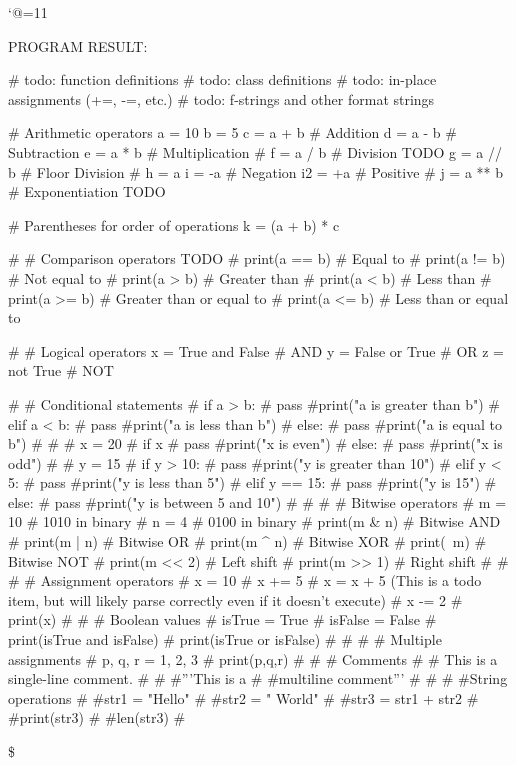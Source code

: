 \let\e\expandafter
\catcode`@=11

\def\@pytexError#1{%
	\errmessage{#1}%
}









\def\@pytexChar@Backslash{\loggingall\@pytexParser@parse}
\let\@pytexChar@Dollar\bye

\def\@pytexChar@DoubleQuote{\relax}
\def\@pytexChar@SingleQuote{\relax}


%

PROGRAM RESULT:

\@pytexCatcodes@setallactive

# todo: function definitions
# todo: class definitions
# todo: in-place assignments (+=, -=, etc.)
# todo: f-strings and other format strings


# Arithmetic operators
a = 10
b = 5
c = a + b  # Addition
d = a - b  # Subtraction
e = a * b  # Multiplication
# f = a / b  # Division TODO
g = a // b # Floor Division
# h = a %
i = -a     # Negation
i2 = +a    # Positive
# j = a ** b # Exponentiation TODO


# Parentheses for order of operations
k = (a + b) * c

# # Comparison operators TODO
# print(a == b)  # Equal to
# print(a != b)  # Not equal to
# print(a > b)   # Greater than
# print(a < b)   # Less than
# print(a >= b)  # Greater than or equal to
# print(a <= b)  # Less than or equal to


# # Logical operators
x = True and False  # AND
y = False or True   # OR
z = not True        # NOT


# # Conditional statements
# if a > b:
#     pass #print("a is greater than b")
# elif a < b:
#     pass #print("a is less than b")
# else:
#     pass #print("a is equal to b")
# 
# 
# x = 20
# if x %
#     pass #print("x is even")
# else:
#     pass #print("x is odd")
# 
# y = 15
# if y > 10:
#     pass #print("y is greater than 10")
# elif y < 5:
# 	pass #print("y is less than 5")
# elif y == 15:
#     pass #print("y is 15")
# else:
#     pass #print("y is between 5 and 10")
# 
# 
# # Bitwise operators
# m = 10  # 1010 in binary
# n = 4   # 0100 in binary
# print(m & n)  # Bitwise AND
# print(m | n)  # Bitwise OR
# print(m ^ n)  # Bitwise XOR
# print(~m)   # Bitwise NOT
# print(m << 2) # Left shift
# print(m >> 1) # Right shift
# 
# 
# # Assignment operators
# x = 10
# x += 5  # x = x + 5  (This is a todo item, but will likely parse correctly even if it doesn't execute)
# x -= 2
# print(x)
# 
# # Boolean values
# isTrue = True
# isFalse = False
# print(isTrue and isFalse)
# print(isTrue or isFalse)
# 
# 
# # Multiple assignments
# p, q, r = 1, 2, 3
# print(p,q,r)
# 
# # Comments
# # This is a single-line comment.
# 
# #'''This is a 
# #multiline comment'''
# 
# 
# #String operations
# #str1 = "Hello"
# #str2 = " World"
# #str3 = str1 + str2
# #print(str3)
# #len(str3)
# 

\$
\bye
